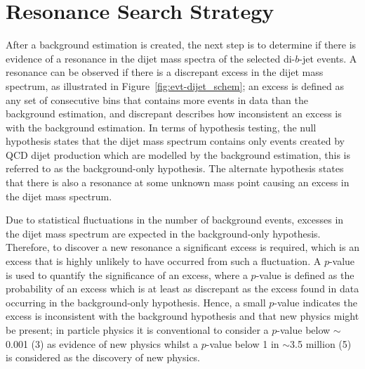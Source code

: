 \section{Resonance Search Strategy}
\label{sec:bkg-bh}

After a background estimation is created, the next step is to determine
if there is evidence of a resonance in the dijet mass spectra of the selected di-$b$-jet events.
A resonance can be observed if there is a discrepant excess in the dijet mass spectrum, as illustrated in Figure~\ref{fig:evt-dijet_schem};
an excess is defined as any set of consecutive bins that contains
more events in data than the background estimation,
and discrepant describes how inconsistent an excess is with the background estimation.
In terms of hypothesis testing,
the null hypothesis states that the dijet mass spectrum contains only events created by QCD dijet production
which are modelled by the background estimation,
this is referred to as the background-only hypothesis.
The alternate hypothesis states that there is also a resonance at some
unknown mass point causing an excess in the dijet mass spectrum.

Due to statistical fluctuations in the number of background events,
excesses in the dijet mass spectrum are expected in the background-only hypothesis.
Therefore, to discover a new resonance a significant excess is required,
which is an excess that is highly unlikely to have occurred from such a fluctuation.
A \mbox{$p$-value} is used to quantify the significance of an excess,
where a \mbox{$p$-value} is defined as the probability of an excess which is at least as discrepant as the excess found in data
occurring in the background-only hypothesis.
Hence, a small \mbox{$p$-value} indicates the excess is inconsistent with the background hypothesis and that new physics might be present;
in particle physics it is conventional to consider a \mbox{$p$-value} below $\sim$0.001 (3\sigma) as evidence of new physics
whilst a \mbox{$p$-value} below 1 in $\sim$3.5 million (5\sigma) is considered as the discovery of new physics.

